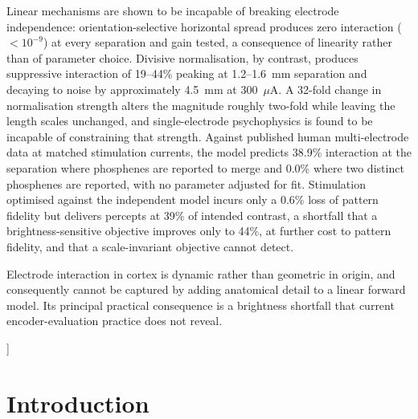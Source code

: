 \documentclass[10pt,twocolumn]{article}
\newcommand{\uA}{\ensuremath{\mu\text{A}}}
\begin{document}
\begin{@twocolumnfalse}
\begin{center}
\begin{minipage}{0.92\textwidth}
    \smallskip
    \noindent Linear mechanisms are shown to be
    incapable of breaking electrode independence: orientation-selective
    horizontal spread produces zero interaction ($<10^{-9}$) at every
    separation and gain tested, a consequence of linearity rather than of
    parameter choice. Divisive normalisation, by contrast, produces
    suppressive interaction of 19--44\% peaking at 1.2--1.6~mm separation and
    decaying to noise by approximately 4.5~mm at 300~\uA. A 32-fold change in
    normalisation strength alters the magnitude roughly two-fold while
    leaving the length scales unchanged, and single-electrode psychophysics
    is found to be incapable of constraining that strength. Against
    published human multi-electrode data at matched stimulation currents,
    the model predicts 38.9\% interaction at the separation where phosphenes
    are reported to merge and 0.0\% where two distinct phosphenes are
    reported, with no parameter adjusted for fit. Stimulation optimised
    against the independent model incurs only a 0.6\% loss of pattern
    fidelity but delivers percepts at 39\% of intended contrast, a shortfall
    that a brightness-sensitive objective improves only to 44\%, at further
    cost to pattern fidelity, and that a scale-invariant objective cannot
    detect.

    \smallskip
    \noindent Electrode interaction in cortex is
    dynamic rather than geometric in origin, and consequently cannot be
    captured by adding anatomical detail to a linear forward model. Its
    principal practical consequence is a brightness shortfall that current
    encoder-evaluation practice does not reveal.
    \end{minipage}
    \end{center}
    \bigskip
  \end{@twocolumnfalse}
]


\section{Introduction}
\end{document}
